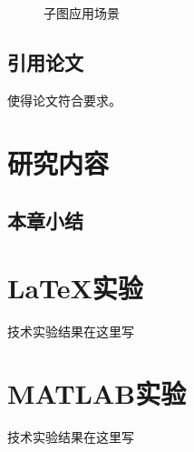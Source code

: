 \documentclass[bachelor, nocolorlinks, printoneside]{seuthesis} %
\begin{document}
\begin{Main}
\begin{figure}
\centering
{}
\caption{子图应用场景}
\end{figure}

\section{引用论文}
使得论文符合要求\cite{Yao:2015ix}\cite{seucover}。

\chapter{研究内容}
\section{本章小结}

\end{Main} %



\begin{Appendix}{}
    \chapter{{\LaTeX}实验}
    技术实验结果在这里写
    \chapter{MATLAB实验}
    技术实验结果在这里写
\end{Appendix}
\end{document}
